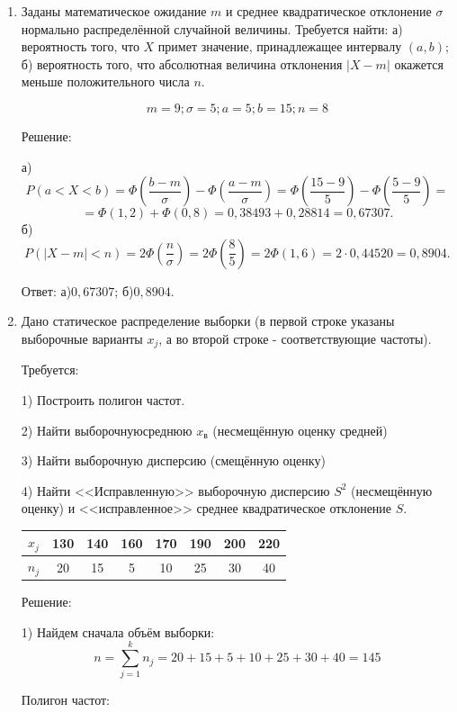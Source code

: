 \documentclass{article}
\begin{document}
\begin{enumerate}
\item %
Заданы математическое ожидание $m$ и среднее квадратическое отклонение $\sigma$ нормально распределённой случайной величины. \newline
Требуется найти: а) вероятность того, что $X$ примет значение, принадлежащее интервалу $(a, b)$; \newline
б) вероятность того, что абсолютная величина отклонения $|X-m|$ окажется меньше положительного числа $n$.

$$m=9;\sigma=5;a=5;b=15;n=8$$
\begin{center}Решение:\end{center}
а) $$P(a<X<b)=\Phi\left(\frac{b-m}{\sigma}\right)-\Phi\left(\frac{a-m}{\sigma}\right)=\Phi\left(\frac{15-9}{5}\right)-\Phi\left(\frac{5-9}{5}\right)=$$
$$=\Phi(1,2)+\Phi(0,8)=0,38493+0,28814=0,67307.$$
б)
$$P (|X-m| < n)= 2\Phi\left(\frac{n}{\sigma}\right)=2\Phi\left(\frac{8}{5}\right)=2\Phi(1,6)=2\cdot0,44520=0,8904.$$

Ответ: а)$0,67307$; б)$0,8904$.

\item %
Дано статическое распределение выборки (в первой строке указаны выборочные варианты $x_j$, а во второй строке - соответствующие частоты).

Требуется:

1) Построить полигон частот.

2) Найти выборочнуюсреднюю $x_\textit{в}$ (несмещённую оценку средней)

3) Найти выборочную дисперсию (смещённую оценку)

4) Найти <<Исправленную>> выборочную дисперсию $S^2$ (несмещённую оценку) и <<исправленное>> среднее квадратическое отклонение $S$.

\begin{center}
\begin{tabular}{|c|c|c|c|c|c|c|c|}
\hline
$x_j$ & 130 & 140 & 160 & 170 & 190 & 200 & 220 \\
\hline
$n_j$ & 20 & 15 & 5 & 10 & 25 & 30 & 40 \\
\hline
\end{tabular}
\end{center}
\begin{center}Решение:\end{center}
1) Найдем сначала объём выборки: $$n=\sum_{j=1}^k n_j=20+15+5+10+25+30+40=145$$

Полигон частот:


\end{enumerate}
\end{document}
